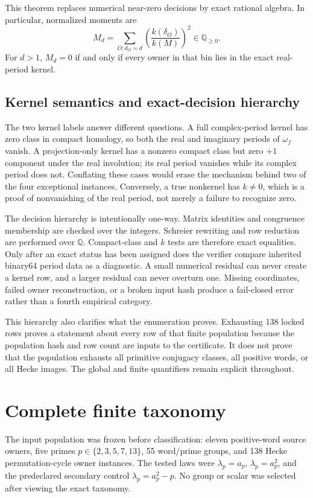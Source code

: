\documentclass[11pt]{article}
\theoremstyle{definition}
\theoremstyle{remark}
\newcommand{\QQ}{\mathbb Q}
\begin{document}
This theorem replaces numerical near-zero decisions by exact rational algebra. In particular, normalized moments are
\[
M_d=\sum_{O:d_O=d}\left(\frac{k(\delta_O)}{k(M)}\right)^2\in\QQ_{\geq0}.
\]
For $d>1$, $M_d=0$ if and only if every owner in that bin lies in the exact real-period kernel.

\subsection{Kernel semantics and exact-decision hierarchy}

The two kernel labels answer different questions. A full complex-period kernel has zero class in compact homology, so both the real and imaginary periods of $\omega_f$ vanish. A projection-only kernel has a nonzero compact class but zero $+1$ component under the real involution; its real period vanishes while its complex period does not. Conflating these cases would erase the mechanism behind two of the four exceptional instances. Conversely, a true nonkernel has $k\neq0$, which is a proof of nonvanishing of the real period, not merely a failure to recognize zero.

The decision hierarchy is intentionally one-way. Matrix identities and congruence membership are checked over the integers. Schreier rewriting and row reduction are performed over $\QQ$. Compact-class and $k$ tests are therefore exact equalities. Only after an exact status has been assigned does the verifier compare inherited binary64 period data as a diagnostic. A small numerical residual can never create a kernel row, and a larger residual can never overturn one. Missing coordinates, failed owner reconstruction, or a broken input hash produce a fail-closed error rather than a fourth empirical category.

This hierarchy also clarifies what the enumeration proves. Exhausting 138 locked rows proves a statement about every row of that finite population because the population hash and row count are inputs to the certificate. It does not prove that the population exhausts all primitive conjugacy classes, all positive words, or all Hecke images. The global and finite quantifiers remain explicit throughout.

\section{Complete finite taxonomy}

The input population was frozen before classification: eleven positive-word source owners, five primes $p\in\{2,3,5,7,13\}$, 55 word/prime groups, and 138 Hecke permutation-cycle owner instances. The tested laws were $\lambda_p=a_p$, $\lambda_p=a_p^2$, and the predeclared secondary control $\lambda_p=a_p^2-p$. No group or scalar was selected after viewing the exact taxonomy.
\end{document}
